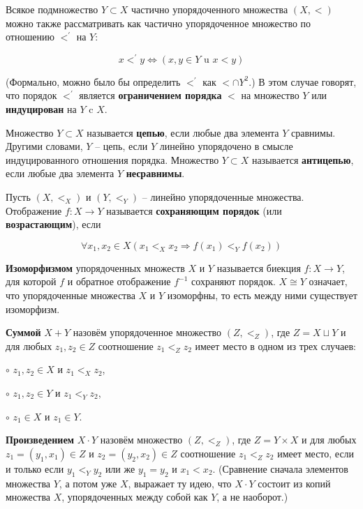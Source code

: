 \begin{definition}
Всякое подмножество $Y \subset X$ частично упорядоченного множества $(X, <)$ можно также рассматривать как частично упорядоченное множество по отношению $<^\prime$ на $Y$:

$$
x<^{\prime} y \Longleftrightarrow(x, y \in Y \text { u } x<y)
$$

(Формально, можно было бы определить $<^\prime$ как $< \cap Y^2$.) В этом случае говорят, что порядок $<^\prime$ является \textbf{ограничением порядка} $<$ на множество $Y$ или \textbf{индуцирован} на $Y$ c $X$.

Множество $Y \subset X$ называется \textbf{цепью}, если любые два элемента $Y$ сравнимы. Другими словами, $Y$ -- цепь, если $Y$ линейно упорядочено в смысле индуцированного отношения порядка. Множество $Y \subset X$ называется \textbf{антицепью}, если любые два элемента $Y$ \textbf{несравнимы}.
\end{definition}

\begin{definition}
Пусть $(X, <_X)$ и $(Y, <_Y)$ -- линейно упорядоченные множества. Отображение $f : X \rightarrow Y$ называется \textbf{сохраняющим порядок} (или \textbf{возрастающим}), если

$$
\forall x_{1}, x_{2} \in X\left(x_{1}<_{X} x_{2} \Rightarrow f\left(x_{1}\right)<_{Y} f\left(x_{2}\right)\right)
$$

\textbf{Изоморфизмом} упорядоченных множеств $X$ и $Y$ называется биекция $f : X \rightarrow Y$, для которой $f$ и обратное отображение $f^{-1}$ сохраняют порядок. $X \cong Y$ означает, что упорядоченные множества $X$ и $Y$ изоморфны, то есть между ними существует изоморфизм.
\end{definition}

\begin{definition}
\textbf{Суммой} $X+Y$ назовём упорядоченное множество $(Z, <_Z)$, где $Z =
X \sqcup Y$ и для любых $z_1, z_2 \in Z$ соотношение $z_1 <_Z z_2$ имеет место в одном
из трех случаев:

$\circ$ $z_1, z_2 \in X$ и $z_1 <_X z_2$,

$\circ$ $z_1, z_2 \in Y$ и $z_1 <_Y z_2$,

$\circ$ $z_1 \in X$ и $z_1 \in Y$.

\textbf{Произведением} $X \cdot Y$ назовём множество $(Z, <_Z)$, где $Z = Y \times X$ и для любых $z_1 = (y_1, x_1) \in Z$ и $z_2 = (y_2, x_2) \in Z$ соотношение $z_1 <_Z z_2$ имеет место, если и только если $y_1 <_Y y_2$ или же $y_1 = y_2$ и $x_1 < x_2$. (Сравнение сначала элементов множества $Y$, а потом уже $X$, выражает ту идею, что $X \cdot Y$ состоит из копий множества $X$, упорядоченных между собой как $Y$, а не наоборот.)
\end{definition}

